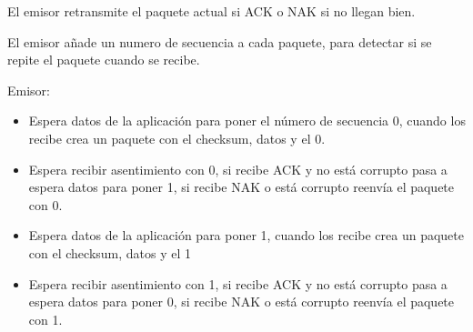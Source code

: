 \documentclass[12pt, twoside, openright]{report} %
\begin{document}
El emisor retransmite el paquete actual si ACK o NAK si no llegan
bien.

El emisor añade un numero de secuencia a cada paquete, para
detectar si se repite el paquete cuando se recibe.

Emisor:
\begin{figure}[H]
	{\def\svgwidth{.9\textwidth}
		}
\end{figure}
\begin{itemize}
	\item Espera datos de la aplicación para poner el número de secuencia
	      0, cuando los recibe crea un paquete con el checksum, datos y el
	      0.
	\item Espera recibir asentimiento con 0, si recibe ACK y no está
	      corrupto pasa a espera datos para poner 1, si recibe NAK o está
	      corrupto reenvía el paquete con 0.
	\item Espera datos de la aplicación para poner 1, cuando los recibe
	      crea un paquete con el checksum, datos y el 1
	\item Espera recibir asentimiento con 1, si recibe ACK y no está
	      corrupto pasa a espera datos para poner 0, si recibe NAK o está
	      corrupto reenvía el paquete con 1.
\end{itemize}
\end{document}
